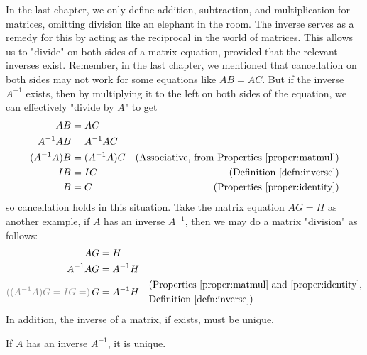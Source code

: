 In the last chapter, we only define addition, subtraction, and multiplication for matrices, omitting division like an elephant in the room. The inverse serves as a remedy for this by acting as the reciprocal in the world of matrices. This allows us to "divide" on both sides of a matrix equation, provided that the relevant inverses exist. Remember, in the last chapter, we mentioned that cancellation on both sides may not work for some equations like $AB = AC$. But if the inverse $A^{-1}$ exists, then by multiplying it to the left on both sides of the equation, we can effectively "divide by $A$" to get
\begin{align*}
AB &= AC \\
A^{-1}AB &= A^{-1}AC \\
(A^{-1}A)B &= (A^{-1}A)C & \text{(Associative, from Properties \ref{proper:matmul})} \\
IB &= IC & \text{(Definition \ref{defn:inverse})} \\
B &= C & \text{(Properties \ref{proper:identity})}
\end{align*}
so cancellation holds in this situation. Take the matrix equation $AG = H$ as another example, if $A$ has an inverse $A^{-1}$, then we may do a matrix "division" as follows:
\begin{align*}
AG &= H \\
A^{-1}AG &= A^{-1}H \\
\textcolor{gray}{((A^{-1}A)G = IG =)} \, G &= A^{-1}H & 
\begin{aligned}
& \text{(Properties \ref{proper:matmul} and \ref{proper:identity},} \\    
& \text{Definition \ref{defn:inverse})}
\end{aligned} 
\end{align*}
In addition, the inverse of a matrix, if exists, must be unique.
\begin{proper}
\label{proper:uniqueinverse}
If $A$ has an inverse $A^{-1}$, it is unique.
\end{proper}
